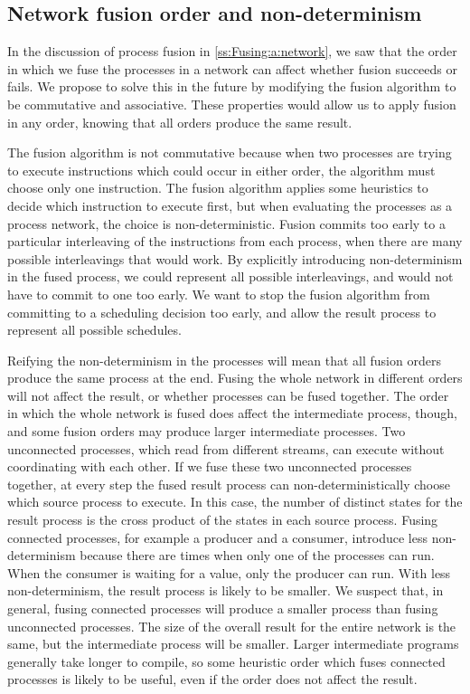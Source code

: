 \subsection{Network fusion order and non-determinism}

In the discussion of process fusion in \cref{ss:Fusing:a:network}, we saw that the order in which we fuse the processes in a network can affect whether fusion succeeds or fails.
We propose to solve this in the future by modifying the fusion algorithm to be commutative and associative.
These properties would allow us to apply fusion in any order, knowing that all orders produce the same result.

The fusion algorithm is not commutative because when two processes are trying to execute instructions which could occur in either order, the algorithm must choose only one instruction.
The fusion algorithm applies some heuristics to decide which instruction to execute first, but when evaluating the processes as a process network, the choice is non-deterministic.
Fusion commits too early to a particular interleaving of the instructions from each process, when there are many possible interleavings that would work.
By explicitly introducing non-determinism in the fused process, we could represent all possible interleavings, and would not have to commit to one too early.
We want to stop the fusion algorithm from committing to a scheduling decision too early, and allow the result process to represent all possible schedules.

Reifying the non-determinism in the processes will mean that all fusion orders produce the same process at the end.
Fusing the whole network in different orders will not affect the result, or whether processes can be fused together.
The order in which the whole network is fused does affect the intermediate process, though, and some fusion orders may produce larger intermediate processes.
Two unconnected processes, which read from different streams, can execute without coordinating with each other.
If we fuse these two unconnected processes together, at every step the fused result process can non-deterministically choose which source process to execute.
In this case, the number of distinct states for the result process is the cross product of the states in each source process.
Fusing connected processes, for example a producer and a consumer, introduce less non-determinism because there are times when only one of the processes can run.
When the consumer is waiting for a value, only the producer can run.
With less non-determinism, the result process is likely to be smaller.
We suspect that, in general, fusing connected processes will produce a smaller process than fusing unconnected processes.
The size of the overall result for the entire network is the same, but the intermediate process will be smaller.
Larger intermediate programs generally take longer to compile, so some heuristic order which fuses connected processes is likely to be useful, even if the order does not affect the result.

